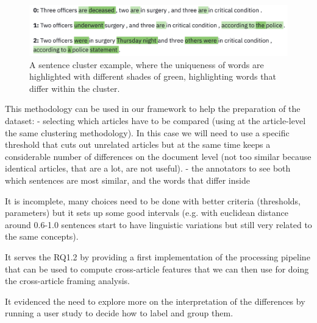 \begin{figure}[!htb]
    \centering
    \includegraphics[width=\textwidth]{figures/words_uniqueness.png}
    \caption{A sentence cluster example, where the uniqueness of words are highlighted with different shades of green, highlighting words that differ within the cluster.}
    \label{fig:words_uniqueness}
\end{figure}



This methodology can be used in our framework to help the preparation of the dataset:
- selecting which articles have to be compared (using at the article-level the same clustering methodology). In this case we will need to use a specific threshold that cuts out unrelated articles but at the same time keeps a considerable number of differences on the document level (not too similar because identical articles, that are a lot, are not useful).
- the annotators to see both which sentences are most similar, and the words that differ inside

It is incomplete, many choices need to be done with better criteria (thresholds, parameters) but it sets up some good intervals (e.g. with euclidean distance around 0.6-1.0 sentences start to have linguistic variations but still very related to the same concepts).

It serves the RQ1.2 by providing a first implementation of the processing pipeline that can be used to compute cross-article features that we can then use for doing the cross-article framing analysis.

It evidenced the need to explore more on the interpretation of the differences by running a user study to decide how to label and group them.


